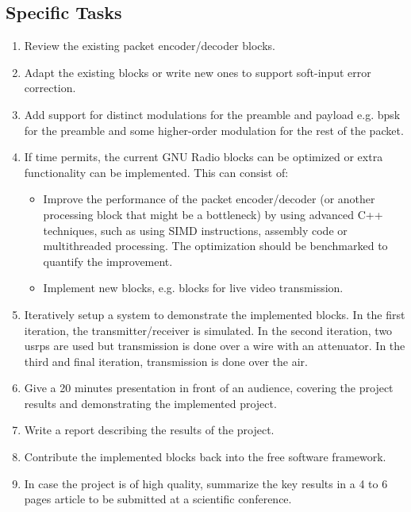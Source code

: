 \documentclass[12pt,english]{TCLsem}
\begin{document}
\subsection{Specific Tasks}
\begin{enumerate}
\item Review the existing packet encoder/decoder blocks.

\item Adapt the existing blocks or write new ones to support soft-input error correction.

\item Add support for distinct modulations for the preamble and payload e.g. \gls{bpsk} for the preamble and some higher-order modulation for the rest of the packet.

\item
If time permits, the current GNU Radio blocks can be optimized or extra functionality can be implemented. This can consist of:

\begin{itemize}
\item Improve the performance of the packet encoder/decoder (or another processing block that might be a bottleneck) by using advanced C++ techniques, such as using SIMD instructions, assembly code or multithreaded processing. The optimization should be benchmarked to quantify the improvement.

\item Implement new blocks, e.g. blocks for live video transmission.
\end{itemize}

\item Iteratively setup a system to demonstrate the implemented blocks.  In the first iteration, the transmitter/receiver is simulated. In the second iteration, two \glspl{usrp} are used but transmission is done over a wire with an attenuator. In the third and final iteration, transmission is done over the air.

\item
Give a 20 minutes presentation in front of an audience, covering the project results and demonstrating the implemented project.

\item Write a report describing the results of the project.

\item Contribute the implemented blocks back into the free software framework.

\item 
In case the project is of high quality, summarize the key results in a 4 to 6 pages article to be submitted at a scientific conference.

\end{enumerate}
\end{document}
